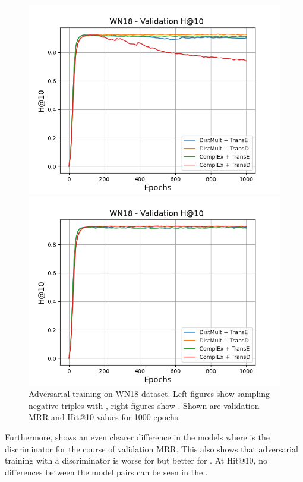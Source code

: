 \begin{figure}[H]
\begin{minipage}{.5\textwidth}
    \end{minipage}
    \begin{minipage}{.5\textwidth}
      \centering
      \includegraphics[width=0.9\linewidth]{figures/results/gan_train/not_pretrained/uncertainty/max/entropy/wn18/1k_epochs/uncertainty_wn18_hit10.png}
    \end{minipage}%
    \begin{minipage}{.5\textwidth}
      \centering
      \includegraphics[width=0.9\linewidth]{figures/results/gan_train/not_pretrained/uncertainty/max_distribution/entropy/wn18/1k_epochs/uncertainty_wn18_hit10.png}
    \end{minipage}%
    \caption{Adversarial training on \textsc{WN18} dataset. 
   Left figures show sampling negative triples with \usmax, right figures show \ussoftmax.
    Shown are validation MRR and Hit@10 values for 1000 epochs.}
    \label{fig:advtrain_wn18_usmax_ussoftmax}
\end{figure}
Furthermore, \ussoftmax shows an even clearer difference in the models where \transd is the discriminator for the course of validation MRR.
This also shows that adversarial training with a \transd discriminator is worse for \usmax but better for \ussoftmax.
At Hit@10, no differences between the model pairs can be seen in the \ussoftmax.

